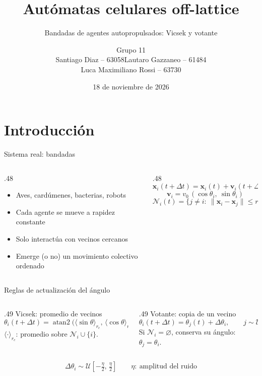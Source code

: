 \documentclass[aspectratio=169,20pt]{beamer}
\title{Autómatas celulares off-lattice}
\subtitle{Bandadas de agentes autopropulsados: Vicsek y votante}
\author{Grupo 11\\Santiago Diaz -- 63058\quad Lautaro Gazzaneo -- 61484\\Luca Maximiliano Rossi -- 63730}
\institute{Simulación de Sistemas -- ITBA}
\date{18 de noviembre de 2026}
\newcommand{\vb}[1]{\mathbf{#1}}
\newcommand{\notaBreve}[1]{{\fontsize{18}{22}\selectfont #1}}
\begin{document}
\begin{frame}\titlepage\end{frame}

\section{Introducción}
\begin{frame}{Sistema real: bandadas}
\begin{columns}[c]
\begin{column}{.48\textwidth}
\begin{itemize}\setlength{\itemsep}{3mm}
\item Aves, cardúmenes, bacterias, robots
\item Cada agente se mueve a rapidez constante
\item Solo interactúa con vecinos cercanos
\item Emerge (o no) un movimiento colectivo ordenado
\end{itemize}
\end{column}
\begin{column}{.48\textwidth}
\[
 \vb x_i(t+\Delta t)=\vb x_i(t)+\vb v_i(t+\Delta t)\,\Delta t
\]
\[
 \vb v_i=v_0\,(\cos\theta_i,\ \sin\theta_i)
\]
\[
 \mathcal N_i(t)=\{j\neq i:\ \|\vb x_i-\vb x_j\|\le r_c\}
\]
\end{column}
\end{columns}
\end{frame}

\begin{frame}{Reglas de actualización del ángulo}
\begin{columns}[T]
\begin{column}{.49\textwidth}
\textcolor{VI}{Vicsek: promedio de vecinos}
\[
 \theta_i(t+\Delta t)=\operatorname{atan2}\!\Big(\langle\sin\theta\rangle_{r_c},\,\langle\cos\theta\rangle_{r_c}\Big)+\Delta\theta_i
\]
\notaBreve{$\langle\cdot\rangle_{r_c}$: promedio sobre $\mathcal N_i\cup\{i\}$.}
\end{column}
\begin{column}{.49\textwidth}
\textcolor{VO}{Votante: copia de un vecino}
\[
 \theta_i(t+\Delta t)=\theta_{j}(t)+\Delta\theta_i,\qquad j\sim\mathcal U(\mathcal N_i)
\]
\notaBreve{Si $\mathcal N_i=\varnothing$, conserva su ángulo: $\theta_j=\theta_i$.}
\end{column}
\end{columns}
\vspace{8mm}
\[
 \Delta\theta_i\sim\mathcal U\!\left[-\tfrac{\eta}{2},\,\tfrac{\eta}{2}\right]\qquad\eta:\ \text{amplitud del ruido}
\]
\end{frame}
\end{document}
